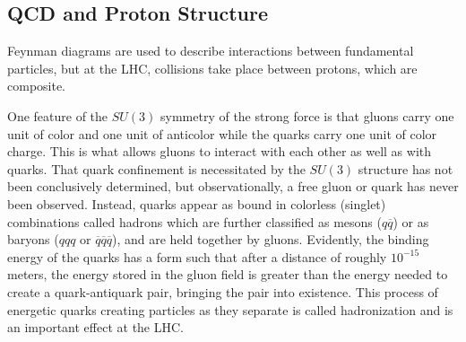 \begin{table}[tb]
\caption[Fundamental particle decay channels and rates]
{
 Below are listed the decay channels and 
  rates for each of the unstable
  fundamental particles.
 At CMS, with the detection apparatus
  located a finite distance away from the
  interaction vertex, particles such as the
  $W$, $Z$ and Higgs bosons,
  as well as the $t$ and $tau$, decay before
  reaching the first layer of the detector.
}
\label{tab:lifetimes}
\begin{center}
\end{center}
\end{table}
 

\subsection{QCD and Proton Structure}\label{sec:protonstructure}
 Feynman diagrams are used to %
  describe interactions between fundamental particles,
  but at the LHC, collisions take place between
  protons, which are composite.

 One feature of the $SU(3)$ symmetry of the
  strong force is that gluons
  carry one unit of color and one unit of anticolor
  while the quarks carry one unit of color charge.
 This is what allows gluons to interact with each other
  as well as with quarks.
 That quark confinement is necessitated by the $SU(3)$
  structure has not been conclusively determined, 
  but observationally, a free gluon or quark has 
  never been observed.
 Instead, quarks appear as bound in colorless (singlet)
  combinations called hadrons
  which are further classified as mesons ($q\overline{q}$)
  or as baryons ($qqq$ or
  $\overline{q}\overline{q}\overline{q}$),
  and are held together by gluons.
 Evidently, the binding energy of the
  quarks has a form such that
  after a distance of roughly $10^{-15}$ meters,
  the energy
  stored in the gluon field is greater
  than the energy needed to create a
  quark-antiquark pair, bringing the pair
  into existence.
 This process of energetic quarks
  creating particles as they
  separate is called hadronization
  and is an important effect at the LHC.

